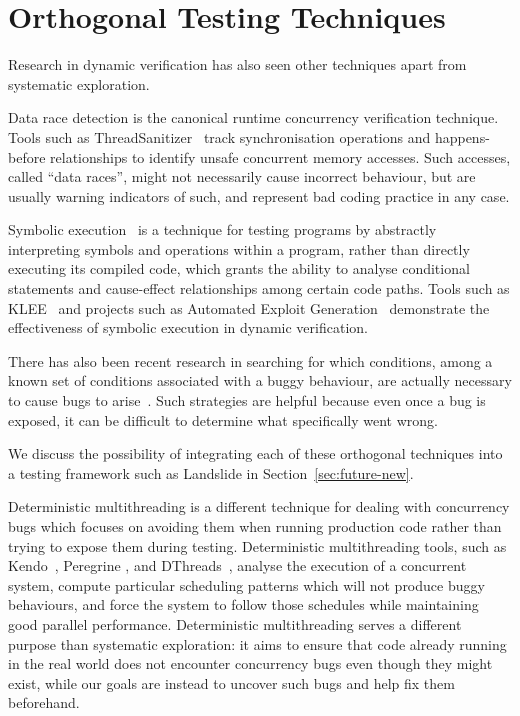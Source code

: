 \section{Orthogonal Testing Techniques}
\label{sec:related-orthogonal}

Research in dynamic verification has also seen other techniques apart from systematic exploration.

Data race detection is the canonical runtime concurrency verification technique. Tools such as ThreadSanitizer~\cite{tsan} track synchronisation operations and happens-before relationships to identify unsafe concurrent memory accesses. Such accesses, called ``data races'', might not necessarily cause incorrect behaviour, but are usually warning indicators of such, and represent bad coding practice in any case.

Symbolic execution~\cite{symbolic,symbolic-disks} is a technique for testing programs by abstractly interpreting symbols and operations within a program, rather than directly executing its compiled code, which grants the ability to analyse conditional statements and cause-effect relationships among certain code paths.
Tools such as KLEE~\cite{klee} and projects such as Automated Exploit Generation~\cite{aeg} demonstrate the effectiveness of symbolic execution in dynamic verification.

There has also been recent research in searching for which conditions, among a known set of conditions associated with a buggy behaviour, are actually necessary to cause bugs to arise~\cite{dag-mining}. Such strategies are helpful because even once a bug is exposed, it can be difficult to determine what specifically went wrong.

We discuss the possibility of integrating each of these orthogonal techniques into a testing framework such as Landslide in Section~\ref{sec:future-new}.

Deterministic multithreading is a different technique for dealing with concurrency bugs which focuses on avoiding them when running production code rather than trying to expose them during testing. Deterministic multithreading tools, such as Kendo~\cite{kendo}, Peregrine \cite{peregrine}, and DThreads~\cite{dthreads}, analyse the execution of a concurrent system, compute particular scheduling patterns which will not produce buggy behaviours, and force the system to follow those schedules while maintaining good parallel performance.
Deterministic multithreading serves a different purpose than systematic exploration: it aims to ensure that code already running in the real world does not encounter concurrency bugs even though they might exist, while our goals are instead to uncover such bugs and help fix them beforehand.

